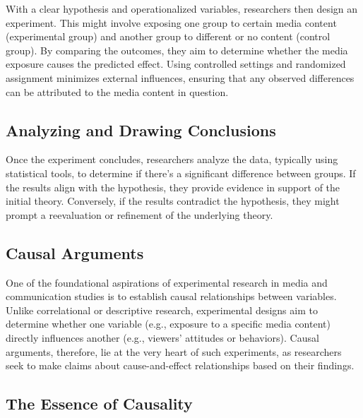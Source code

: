 \documentclass[
  b5paper]{book}
\begin{document}
With a clear hypothesis and operationalized variables, researchers then design an experiment. This might involve exposing one group to certain media content (experimental group) and another group to different or no content (control group). By comparing the outcomes, they aim to determine whether the media exposure causes the predicted effect. Using controlled settings and randomized assignment minimizes external influences, ensuring that any observed differences can be attributed to the media content in question.

\hypertarget{analyzing-and-drawing-conclusions}{%
\subsection*{Analyzing and Drawing Conclusions}\label{analyzing-and-drawing-conclusions}}

Once the experiment concludes, researchers analyze the data, typically using statistical tools, to determine if there's a significant difference between groups. If the results align with the hypothesis, they provide evidence in support of the initial theory. Conversely, if the results contradict the hypothesis, they might prompt a reevaluation or refinement of the underlying theory.

\hypertarget{causal-arguments}{%
\subsection*{Causal Arguments}\label{causal-arguments}}

One of the foundational aspirations of experimental research in media and communication studies is to establish causal relationships between variables. Unlike correlational or descriptive research, experimental designs aim to determine whether one variable (e.g., exposure to a specific media content) directly influences another (e.g., viewers' attitudes or behaviors). Causal arguments, therefore, lie at the very heart of such experiments, as researchers seek to make claims about cause-and-effect relationships based on their findings.

\hypertarget{the-essence-of-causality}{%
\subsection*{The Essence of Causality}\label{the-essence-of-causality}}
\end{document}
